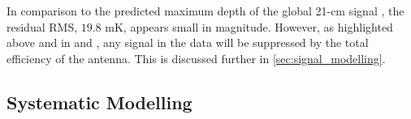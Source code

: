 
In comparison to the predicted maximum depth of the global 21-cm signal \citep[$\approx 165$ mK for standard astrophysical signals in the band $110 - 180$ MHz,][]{Reis_sta_2021}, the residual RMS, $19.8$ mK, appears small in magnitude. However, as highlighted above and in \cite{Singh_saras2_2017} and \cite{Singh_saras2_2018}, any signal in the data will be suppressed by the total efficiency of the antenna. This is discussed further in \cref{sec:signal_modelling}. 

\subsection{Systematic Modelling}
\label{sec:systematic modelling}

